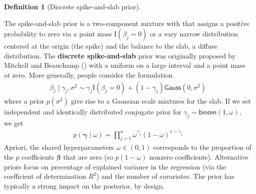\documentclass[
  11pt,
  letterpaper,
]{scrbook}
\theoremstyle{definition}
\newtheorem{definition}{Definition}[chapter]
\theoremstyle{plain}
\theoremstyle{plain}
\theoremstyle{plain}
\theoremstyle{definition}
\theoremstyle{definition}
\theoremstyle{remark}
\begin{document}
\begin{definition}[Discrete spike-and-slab
prior]\protect\hypertarget{def-spike-slab}{}\label{def-spike-slab}

The spike-and-slab prior is a two-component mixture with that assigns a
positive probability to zero via a point mass \(\mathrm{I}(\beta_j=0)\)
or a vary narrow distribution centered at the origin (the spike) and the
balance to the slab, a diffuse distribution. The \textbf{discrete
spike-and-slab} prior was originally proposed by Mitchell and Beauchamp
() with a uniform on a large
interval and a point mass at zero. More generally, people consider the
formulation \begin{align*}
\beta_j \mid \gamma_j, \sigma^2 \sim \gamma_j \mathrm{I}(\beta_j=0) + (1-\gamma_j)\mathsf{Gauss}(0, \sigma^2)
\end{align*} where a prior \(p(\sigma^2)\) give rise to a Gaussian scale
mixtures for the slab. If we set independent and identically distributed
conjugate prior for \(\gamma_j \sim \mathsf{binom}(1, \omega),\) we get
\begin{align*}
p(\boldsymbol{\gamma} \mid \omega) = \prod_{j=1}^n \omega^{\gamma_j} (1-\omega)^{1-\gamma_j}
\end{align*} Apriori, the shared hyperparameters \(\omega \in (0,1)\)
corresponds to the proportion of the \(p\) coefficients
\(\boldsymbol{\beta}\) that are zero (so \(p(1-\omega)\) nonzero
coefficients). Alternative priors focus on precentage of explained
variance in the regression (via the coefficient of determination
\(R^2\)) and the number of covariates. The prior has typically a strong
impact on the posterior, by design.

\end{definition}
\end{document}
